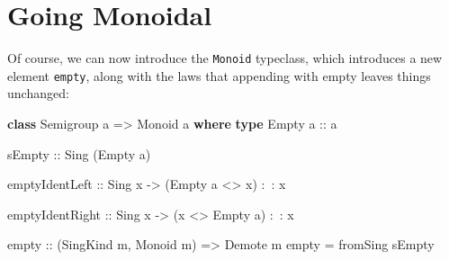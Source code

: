 \documentclass[]{article}
\newenvironment{Shaded}{}{}
\newcommand{\KeywordTok}[1]{\textcolor[rgb]{0.00,0.44,0.13}{\textbf{{#1}}}}
\newcommand{\DataTypeTok}[1]{\textcolor[rgb]{0.56,0.13,0.00}{{#1}}}
\newcommand{\OtherTok}[1]{\textcolor[rgb]{0.00,0.44,0.13}{{#1}}}
\newcommand{\FunctionTok}[1]{\textcolor[rgb]{0.02,0.16,0.49}{{#1}}}
\newcommand{\NormalTok}[1]{{#1}}
\begin{document}
\begin{Shaded}
\end{Shaded}

\section{Going Monoidal}\label{going-monoidal}

Of course, we can now introduce the \texttt{Monoid} typeclass, which introduces
a new element \texttt{empty}, along with the laws that appending with empty
leaves things unchanged:

\begin{Shaded}
\begin{Highlighting}[]
\KeywordTok{class} \DataTypeTok{Semigroup} \NormalTok{a }\OtherTok{=>} \DataTypeTok{Monoid} \NormalTok{a }\KeywordTok{where}
    \KeywordTok{type} \DataTypeTok{Empty}\OtherTok{ a ::} \NormalTok{a}

\OtherTok{    sEmpty ::} \DataTypeTok{Sing} \NormalTok{(}\DataTypeTok{Empty} \NormalTok{a)}

    \NormalTok{emptyIdentLeft}
\OtherTok{        ::} \DataTypeTok{Sing} \NormalTok{x}
        \OtherTok{->} \NormalTok{(}\DataTypeTok{Empty} \NormalTok{a }\FunctionTok{<>} \NormalTok{x) }\FunctionTok{:~:} \NormalTok{x}

    \NormalTok{emptyIdentRight}
\OtherTok{        ::} \DataTypeTok{Sing} \NormalTok{x}
        \OtherTok{->} \NormalTok{(x }\FunctionTok{<>} \DataTypeTok{Empty} \NormalTok{a) }\FunctionTok{:~:} \NormalTok{x}

\NormalTok{empty}
\OtherTok{    ::} \NormalTok{(}\DataTypeTok{SingKind} \NormalTok{m, }\DataTypeTok{Monoid} \NormalTok{m)}
    \OtherTok{=>} \DataTypeTok{Demote} \NormalTok{m}
\NormalTok{empty }\FunctionTok{=} \NormalTok{fromSing sEmpty}
\end{Highlighting}
\end{Shaded}
\end{document}
